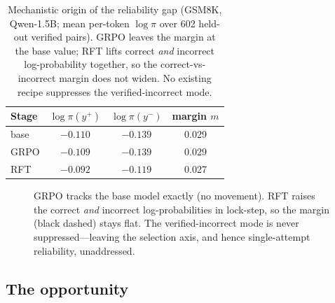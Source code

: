 \begin{table}[htbp]
\centering
\caption{Mechanistic origin of the reliability gap (GSM8K, Qwen-1.5B; mean
per-token $\log\pi$ over 602 held-out verified pairs). GRPO leaves the margin at
the base value; RFT lifts correct \emph{and} incorrect log-probability together,
so the correct-vs-incorrect margin does not widen. No existing recipe suppresses
the verified-incorrect mode.}
\label{tab:margin}
\begin{tabular}{lccc}
\toprule
Stage & $\log\pi(y^{+})$ & $\log\pi(y^{-})$ & margin $m$ \\
\midrule
base  & $-0.110$ & $-0.139$ & 0.029 \\
GRPO  & $-0.109$ & $-0.139$ & 0.029 \\
RFT   & $-0.092$ & $-0.119$ & 0.027 \\
\bottomrule
\end{tabular}
\end{table}

\begin{figure}[htbp]
\centering
{}
\caption{GRPO tracks the base model exactly (no movement). RFT raises the correct
\emph{and} incorrect log-probabilities in lock-step, so the margin (black dashed)
stays flat. The verified-incorrect mode is never suppressed---leaving the
selection axis, and hence single-attempt reliability, unaddressed.}
\label{fig:margin}
\end{figure}

\subsection*{The opportunity}

